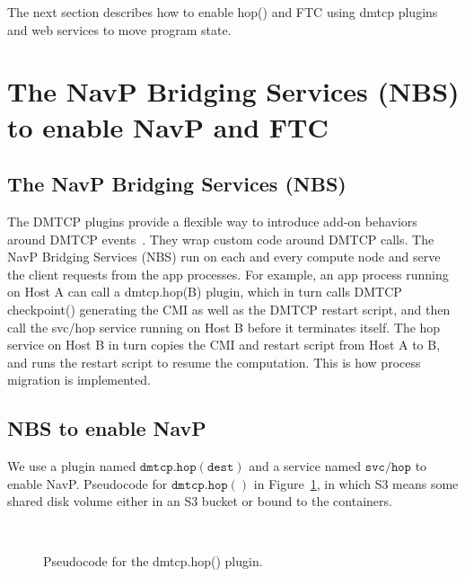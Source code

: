 \documentclass[conference]{IEEEtran}
\begin{document}
The next section describes how to enable hop() and FTC using dmtcp plugins and web services to move program state.


\section{The NavP Bridging Services (NBS) to enable NavP and FTC}
\label{sec:s2}

\subsection{The NavP Bridging Services (NBS)}
\label{subsec:s21}

The DMTCP plugins provide a flexible way to introduce add-on behaviors around DMTCP events~\cite{ansel2009dmtcp}. They wrap custom code around DMTCP calls. The NavP Bridging Services (NBS) run on each and every compute node and serve the client requests from the app processes. For example, an app process running on Host A can call a dmtcp.hop(B) plugin, which in turn calls DMTCP checkpoint() generating the CMI as well as the DMTCP restart script, and then call the svc/hop service running on Host B before it terminates itself. The hop service on Host B in turn copies the CMI and restart script from Host A to B, and runs the restart script to resume the computation. This is how process migration is implemented.

\subsection{NBS to enable NavP}
\label{subsec:s22}

We use a plugin named $\mathtt{dmtcp.hop(dest)}$ and a service named $\mathtt{svc/hop}$ to enable NavP. 
Pseudocode for $\mathtt{dmtcp.hop()}$ in Figure~\ref{code:dmtcp_hop}, in which S3 means some shared disk volume either 
in an S3 bucket or bound to the containers.

\begin{figure}[!ht]
\vspace{0.3in}
\begin{center}
\begin{center}
\mbox{}\\[0.3em]
\end{center}
\hspace{\fill}%
\caption{Pseudocode for the dmtcp.hop() plugin.}
\label{code:dmtcp_hop}
\end{center}
\end{figure}
\end{document}

